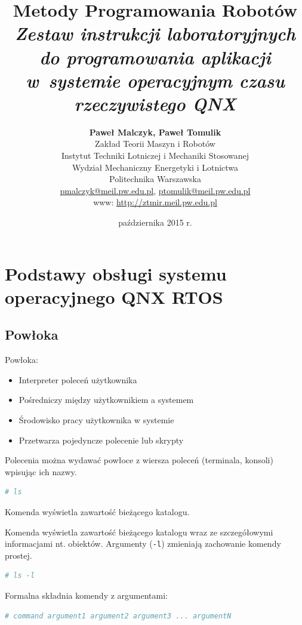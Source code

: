 \documentclass[11pt,twoside,a4paper]{article}
\title{\vspace{4.25cm}\Huge{\textbf{Metody Programowania Robotów}} \\ \vskip10pt\LARGE{\textit{Zestaw instrukcji laboratoryjnych do programowania aplikacji w~systemie operacyjnym czasu rzeczywistego QNX}}}
\author{\Large{\textbf{Paweł Malczyk, Paweł Tomulik}}\vspace{0.5cm} \\ Zakład Teorii Maszyn i Robotów \\
Instytut Techniki Lotniczej i Mechaniki Stosowanej \\
Wydział Mechaniczny Energetyki i Lotnictwa \\
Politechnika Warszawska \\
{\href{mailto:pmalczyk@meil.pw.edu.pl}{pmalczyk@meil.pw.edu.pl}}, \href{mailto:ptomulik@meil.pw.edu.pl}{ptomulik@meil.pw.edu.pl} \\ www: \href{http://ztmir.meil.pw.edu.pl}{http://ztmir.meil.pw.edu.pl}}
\date{października 2015 r.}
\newenvironment{myitemize}
{ \begin{itemize}
    \setlength{\itemsep}{0pt}
    \setlength{\parskip}{0pt}
    \setlength{\parsep}{0pt}     }
{ \end{itemize}                  }
\begin{document}
\maketitle
\cleardoublepage 

\section{Podstawy obsługi systemu operacyjnego QNX RTOS}

\subsection{Powłoka}

Powłoka: 

\begin{myitemize}
\item Interpreter poleceń użytkownika
\item Pośredniczy między użytkownikiem a systemem
\item Środowisko pracy użytkownika w systemie
\item Przetwarza pojedyncze polecenie lub skrypty
\end{myitemize}


\begin{example} \label{ex:prostakomenda} 

Polecenia można wydawać powłoce z wiersza poleceń (terminala, konsoli) wpisując ich nazwy.

\begin{lstlisting}[language=bash]
# ls
\end{lstlisting}

Komenda wyświetla zawartość bieżącego katalogu.  
\end{example}

\begin{example}\label{ex:prostakomenda2} 

Komenda wyświetla zawartość bieżącego katalogu wraz ze szczegółowymi informacjami nt. obiektów. Argumenty (\lstinline{-l}) zmieniają zachowanie komendy prostej.

\begin{lstlisting}[language=bash]
# ls -l 
\end{lstlisting}


Formalna składnia komendy z argumentami:

\begin{lstlisting}[language=bash]
# command argument1 argument2 argument3 ... argumentN
\end{lstlisting}
\end{example}
\end{document}
